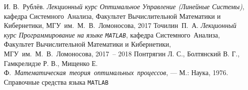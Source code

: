 \documentclass[11pt, oneside, final]{article}
\theoremstyle{break}
\numberwithin{equation}{section}
\theoremstyle{plain}
\theoremstyle{definition}
\begin{document}
    \pagebreak
    \begin{thebibliography}{0}
         И. В.~Рублёв. \emph{Лекционный курс Оптимальное Управление (Линейные Системы)},
        кафедра Системного~Анализа, Факультет Вычислительной Математики и Кибернетики, МГУ~им.~М.~В.~Ломоносова, 
        2017
         Точилин~П.~А. \emph{Лекционный курс Программирование на языке \texttt{MATLAB}},
        кафедра Системного~Анализа, Факультет Вычислительной Математики и Кибернетики, МГУ~им.~М.~В.~Ломоносова, 
        2017~-- 2018
         Понтрягин Л. С., Болтянский В. Г., Гамкрелидзе Р. В., Мищенко Е. Ф.~\emph{Математическая~теория~оптимальных~процессов}, — М.: Наука, 1976.
         Справочные средства языка \texttt{MATLAB}
    \end{thebibliography}
\end{document}

